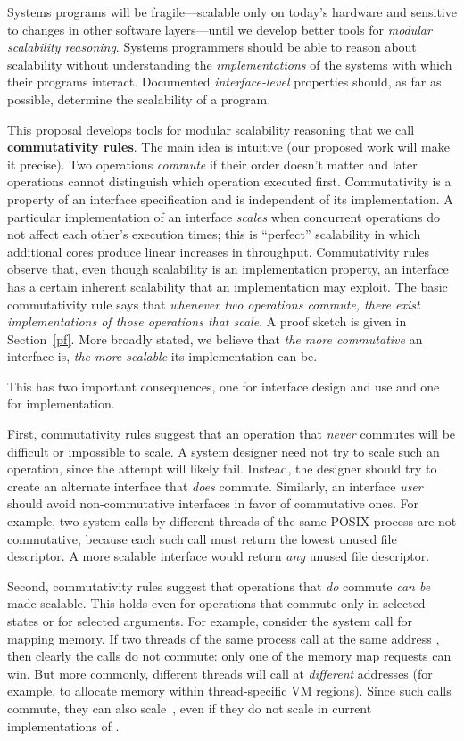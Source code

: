 Systems programs will be fragile---scalable only on today's
hardware and sensitive to changes in other software layers---until we
develop better tools for \emph{modular scalability
  reasoning}.
%
Systems programmers should be able to reason about scalability
without understanding the \emph{implementations} of
the systems with which their programs interact.
%
Documented \emph{interface-level} properties should, as far as
possible, determine the scalability of a program.

This proposal develops tools for modular scalability reasoning that
we call \textbf{commutativity rules}.
%
The main idea is intuitive (our proposed work will make it precise).
%
Two operations \emph{commute} if their order doesn't matter and
later operations cannot distinguish which operation executed first.
%
Commutativity is a property of an interface specification
and is independent of its
implementation.  A particular implementation of an interface
\emph{scales} when concurrent operations do not affect each other's
execution times; this is ``perfect'' scalability in which
additional cores produce linear increases in throughput.
Commutativity rules observe that, even though
scalability is an implementation property, an interface has a certain
inherent scalability that an implementation may exploit.
%
The basic commutativity rule says that \emph{whenever two
operations commute, there exist implementations of those operations that
scale}.
%
A proof sketch is given in Section~\ref{pf}.
%
More broadly stated, we believe that \emph{the more commutative} an
interface is, \emph{the more scalable} its implementation can be.

This has two important consequences, one for interface design and use
and one for implementation.

First, commutativity rules suggest that an operation that
\emph{never} commutes will be difficult or impossible to scale.
%
A system designer need not try to scale such an operation, since the
attempt will likely fail.
%
Instead, the designer should try to create an alternate interface that
\emph{does} commute.
%
Similarly, an interface \emph{user} should avoid non-commutative
interfaces in favor of commutative ones.
%
For example, two  system calls by different threads of
the same POSIX process are not commutative, because each such call
must return the lowest unused file descriptor.
%
A more scalable  interface would return \emph{any}
unused file descriptor.

Second, commutativity rules suggest that operations that
\emph{do} commute \emph{can be} made scalable.
%
This holds even for operations that commute only in selected states or for
selected arguments.
%
For example, consider the  system call for mapping
memory.
%
If two threads of the same process call  at the same
address , then clearly the calls do not commute: only one
of the memory map requests can win.
%
But more commonly, different threads will call  at
\emph{different} addresses (for example, to allocate memory within
thread-specific VM regions).
%
Since such calls commute, they can also scale~\cite{clements:bonsai},
even if they do not scale in current implementations of
.


